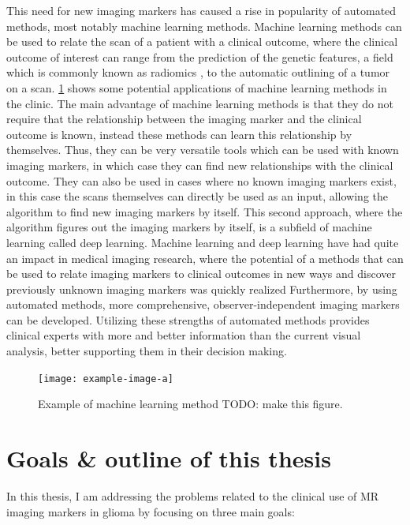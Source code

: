 This need for new imaging markers has caused a rise in popularity of automated methods, most notably machine learning methods.
Machine learning methods can be used to relate the scan of a patient with a clinical outcome, where the clinical outcome of interest can range from the prediction of the genetic features, a field which is commonly known as radiomics \autocite{lambin2012radiomics}, to the automatic outlining of a \gls{tumor} on a scan.
\cref{fig:intro_example_ml} shows some potential applications of machine learning methods in the clinic.
The main advantage of machine learning methods is that they do not require that the relationship between the imaging marker and the clinical outcome is known, instead these methods can learn this relationship by themselves.
Thus, they can be very versatile tools which can be used with known imaging markers, in which case they can find new relationships with the clinical outcome.
They can also be used in cases where no known imaging markers exist, in this case the scans themselves can directly be used as an input, allowing the algorithm to find new imaging markers by itself.
This second approach, where the algorithm figures out the imaging markers by itself, is a subfield of machine learning called deep learning.
Machine learning and deep learning have had quite an impact in medical imaging research, where the potential of a methods that can be used to relate imaging markers to clinical outcomes in new ways and discover previously unknown imaging markers was quickly realized \autocite{june2017deep, gillies2016radiomics}
Furthermore, by using automated methods, more comprehensive, observer-independent imaging markers can be developed.
Utilizing these strengths of automated methods provides clinical experts with more and better information than the current visual analysis, better supporting them in their decision making.

\begin{figure}
\texttt{[image: example-image-a]}
\caption{Example of machine learning method TODO: make this figure.}\label{fig:intro_example_ml}
\end{figure}


\section{Goals \& outline of this thesis}

In this thesis, I am addressing the problems related to the clinical use of \acrshort{MR} imaging markers in glioma by focusing on three main goals:

